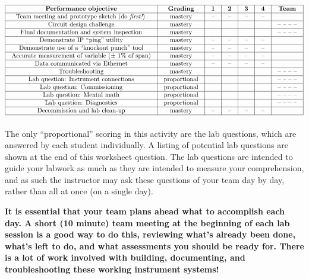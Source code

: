 $$\vbox{\offinterlineskip
\halign{\strut
\vrule \quad\hfil # \ \hfil & 
\vrule \quad\hfil # \ \hfil & 
\vrule \quad\hfil # \ \hfil & 
\vrule \quad\hfil # \ \hfil & 
\vrule \quad\hfil # \ \hfil & 
\vrule \quad\hfil # \ \hfil & 
\vrule \quad\hfil # \ \hfil \vrule \cr
\noalign{\hrule}
%
{\bf Performance objective} & {\bf Grading} & {\bf 1} & {\bf 2} & {\bf 3} & {\bf 4} & {\bf Team} \cr
%
\noalign{\hrule}
%
Team meeting and prototype sketch (do {\it first!}) & mastery & -- & -- & -- & -- & \cr
%
\noalign{\hrule}
%
Circuit design challenge & mastery & & & & & -- -- -- -- \cr
%
\noalign{\hrule}
%
Final documentation and system inspection & mastery & & & & & -- -- -- -- \cr
%
\noalign{\hrule}
%
Demonstrate IP ``ping'' utility & mastery & -- & -- & -- & -- &  \cr
%
\noalign{\hrule}
%
Demonstrate use of a ``knockout punch'' tool & mastery & -- & -- & -- & -- &  \cr
%
\noalign{\hrule}
%
Accurate measurement of variable ($\pm$ 1\% of span) & mastery & -- & -- & -- & -- &  \cr
%
\noalign{\hrule}
%
Data communicated via Ethernet & mastery & -- & -- & -- & -- &  \cr
%
\noalign{\hrule}
%
Troubleshooting & mastery & & & & & -- -- -- -- \cr
%
\noalign{\hrule}
%
Lab question: Instrument connections & proportional &  &  &  &  & -- -- -- -- \cr
%
\noalign{\hrule}
%
Lab question: Commissioning & proportional &  &  &  &  & -- -- -- -- \cr
%
\noalign{\hrule}
%
Lab question: Mental math & proportional &  &  &  &  & -- -- -- -- \cr
%
\noalign{\hrule}
%
Lab question: Diagnostics & proportional &  &  &  &  & -- -- -- -- \cr
%
\noalign{\hrule}
%
Decommission and lab clean-up & mastery & -- & -- & -- & -- &  \cr
%
\noalign{\hrule}
} %
}$$ %

The only ``proportional'' scoring in this activity are the lab questions, which are answered by each student individually.  A listing of potential lab questions are shown at the end of this worksheet question.  The lab questions are intended to guide your labwork as much as they are intended to measure your comprehension, and as such the instructor may ask these questions of your team day by day, rather than all at once (on a single day).

\vskip 10pt

{\bf It is essential that your team plans ahead what to accomplish each day.  A short (10 minute) team meeting at the beginning of each lab session is a good way to do this, reviewing what's already been done, what's left to do, and what assessments you should be ready for.  There is a lot of work involved with building, documenting, and troubleshooting these working instrument systems!}

